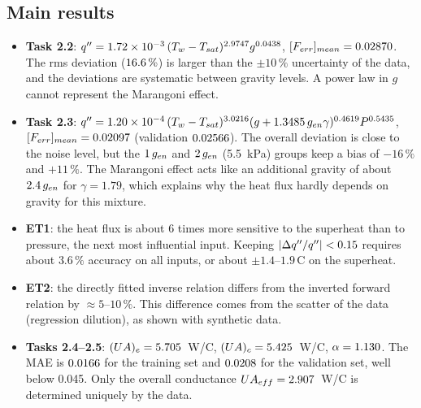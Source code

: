 \subsection{Main results}
\begin{itemize}
  \item \textbf{Task 2.2}: $q''=1.72\times10^{-3}\,(T_w-T_{sat})^{2.9747}g^{0.0438}$, $[F_{err}]_{mean}=0.02870$.
        The rms deviation ($16.6\,\%$) is larger than the $\pm10\,\%$ uncertainty of the data, and
        the deviations are systematic between gravity levels. A power law in $g$ cannot represent the
        Marangoni effect.
  \item \textbf{Task 2.3}: $q''=1.20\times10^{-4}\,(T_w-T_{sat})^{3.0216}(g+1.3485\,g_{en}\gamma)^{0.4619}P^{0.5435}$,
        $[F_{err}]_{mean}=0.02097$ (validation $0.02566$). The overall deviation is close to the noise
        level, but the $1\,g_{en}$ and $2\,g_{en}$ (5.5~kPa) groups keep a bias of $-16\,\%$ and $+11\,\%$. The
        Marangoni effect acts like an additional gravity of about $2.4\,g_{en}$ for $\gamma=1.79$, which
        explains why the heat flux hardly depends on gravity for this mixture.
  \item \textbf{ET1}: the heat flux is about 6 times more sensitive to the superheat than to pressure, the
        next most influential input. Keeping $|\Delta q''/q''|<0.15$ requires about $3.6\,\%$ accuracy on all inputs, or
        about $\pm1.4$--$1.9$\,\textdegree C on the superheat.
  \item \textbf{ET2}: the directly fitted inverse relation differs from the inverted forward relation by
        $\approx5$--$10\,\%$. This difference comes from the scatter of the data (regression dilution),
        as shown with synthetic data.
  \item \textbf{Tasks 2.4--2.5}: $(UA)_e=5.705$~W/\textdegree C, $(UA)_c=5.425$~W/\textdegree C, $\alpha=1.130$.
        The MAE is $0.0166$ for the training set and $0.0208$ for the validation set, well
        below 0.045. Only the overall conductance $UA_{eff}=2.907$~W/\textdegree C is determined uniquely by the data.
\end{itemize}
